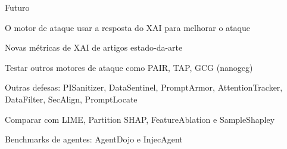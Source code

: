 \documentclass[aspectratio=169]{beamer}
\begin{document}
\begin{frame}{Futuro}
  \begin{ciLista}
    \item O motor de ataque usar a resposta do XAI para melhorar o ataque
    \item Novas métricas de XAI de artigos estado-da-arte
    \item Testar outros motores de ataque como PAIR, TAP, GCG (nanogcg)
    \item Outras defesas: PISanitizer, DataSentinel, PromptArmor, AttentionTracker, DataFilter, SecAlign, PromptLocate
    \item Comparar com LIME, Partition SHAP, FeatureAblation e SampleShapley
    \item Benchmarks de agentes: AgentDojo e InjecAgent
  \end{ciLista}
\end{frame}

\end{document}
